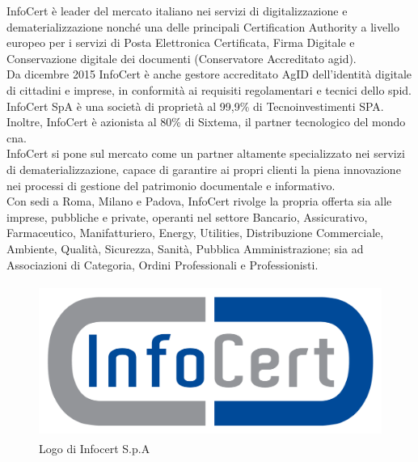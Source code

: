 InfoCert è leader del mercato italiano nei servizi di digitalizzazione e dematerializzazione nonché una delle principali Certification Authority a livello europeo per i servizi di Posta Elettronica Certificata, Firma Digitale e Conservazione digitale dei documenti (Conservatore Accreditato \gls{agid}).\\
Da dicembre 2015 InfoCert è anche gestore accreditato AgID dell’identità digitale di cittadini e imprese, in conformità ai requisiti regolamentari e tecnici dello \gls{spid}. \\
InfoCert SpA è una società di proprietà al 99,9\% di Tecnoinvestimenti SPA. Inoltre, InfoCert è azionista al 80\% di Sixtema, il partner tecnologico del mondo \gls{cna}. \\
InfoCert si pone sul mercato come un partner altamente specializzato nei servizi di dematerializzazione, capace di garantire ai propri clienti la piena innovazione nei processi di gestione del patrimonio documentale e informativo. \\
Con sedi a Roma, Milano e Padova, InfoCert rivolge la propria offerta sia alle imprese, pubbliche e private, operanti nel settore Bancario, Assicurativo, Farmaceutico, Manifatturiero, Energy, Utilities, Distribuzione Commerciale, Ambiente, Qualità, Sicurezza, Sanità, Pubblica Amministrazione; sia ad Associazioni di Categoria, Ordini Professionali e Professionisti.
\begin{figure}[h]
	\centering
	\includegraphics[height=5cm]{immagini/logo-infocert}
	\caption{Logo di Infocert S.p.A}
	\label{img-infocert-logo}
\end{figure}